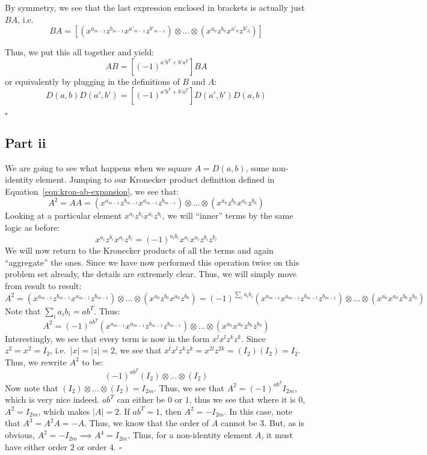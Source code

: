 \documentclass[letterpaper]{article}
\newcommand*{\QED}{\hfill\ensuremath{\square}}%
\begin{document}
By symmetry, we see that the last expression enclosed in brackets is actually just $ BA $, i.e.
\[
BA = \left[(x^{a_{m - 1}} z^{b_{m - 1}} x^{a'_{m - 1}} z^{b'_{m - 1}}) \otimes \ldots \otimes (x^{a_{0}} z^{b_{0}} x^{a'_{0}} z^{b'_{0}}) \right]
\]

Thus, we put this all together and yield:
\[
AB = \left[{(-1)}^{a'b^T + b'a^T}\right] BA
\]
or equivalently by plugging in the definitions of $ B $ and $ A $:
\[
D(a,b)D(a',b') = \left[{(-1)}^{a'b^T + b'a^T}\right] D(a',b')D(a,b)
\]

\QED{}

\subsection{Part ii}
\label{sub:5Partii}

We are going to see what happens when we square $ A = D(a,b) $, some non-identity element.
Jumping to our Kronecker product definition defined in Equation~\ref{eqn:kron-ab-expansion}, we see that:
\[
A^2 = AA = (x^{a_{m - 1}} z^{b_{m - 1}} x^{a_{m - 1}} z^{b_{m - 1}}) \otimes \ldots \otimes (x^{a_{0}} z^{b_{0}} x^{a_{0}} z^{b_{0}})
\]
Looking at a particular element $ x^{a_{i}} z^{b_{i}} x^{a_{i}} z^{b_{i}} $, we will ``inner'' terms by the same logic as before:
\[
x^{a_{i}} z^{b_{i}} x^{a_{i}} z^{b_{i}}
=
{(-1)}^{a_i b_i} x^{a_{i}} x^{a_{i}} z^{b_{i}} z^{b_{i}}
\]
We will now return to the Kronecker products of all the terms and again ``aggregate'' the ones.
Since we have now performed this operation twice on this problem set already, the details are extremely clear.
Thus, we will simply move from result to result:
\[
A^2
=
(x^{a_{m - 1}} z^{b_{m - 1}} x^{a_{m - 1}} z^{b_{m - 1}}) \otimes \ldots \otimes (x^{a_{0}} z^{b_{0}} x^{a_{0}} z^{b_{0}})
=
{(-1)}^{\sum_i a_i b_i}
(x^{a_{m - 1}} x^{a_{m - 1}} z^{b_{m - 1}} z^{b_{m - 1}}) \otimes \ldots \otimes (x^{a_{0}} x^{a_{0}} z^{b_{0}} z^{b_{0}})
\]
Note that $ \sum_i a_i b_i = ab^T $.
Thus:
\[
A^2 =
{(-1)}^{ab^T}
(x^{a_{m - 1}} x^{a_{m - 1}} z^{b_{m - 1}} z^{b_{m - 1}}) \otimes \ldots \otimes (x^{a_{0}} x^{a_{0}} z^{b_{0}} z^{b_{0}})
\]
Interestingly, we see that every term is now in the form $ x^l x^l z^k z^k $.
Since $ z^2 = x^2 = I_2 $, i.e.\ $ |x| = |z| = 2 $, we see that $ x^l x^l z^k z^k = x^{2l} z^{2k} = (I_2)(I_2) = I_2 $.
Thus, we rewrite $ A^2 $ to be:
\[
{(-1)}^{ab^T}
(I_2) \otimes \ldots \otimes (I_2)
\]
Now note that $ (I_2) \otimes \ldots \otimes (I_2) = I_{2m} $.
Thus, we see that $ A^2 = {(-1)}^{ab^T} I_{2m} $, which is very nice indeed.
$ ab^T $ can either be $ 0 $ or $ 1 $, thus we see that where it is $ 0 $, $ A^2 = I_{2m} $, which makes $ |A| = 2 $.
If $ ab^T = 1 $, then $ A^2 = -I_{2m} $.
In this case, note that $ A^3 = A^2 A = -A $.
Thus, we know that the order of $ A $ cannot be $ 3 $.
But, as is obvious, $ A^2 = -I_{2m} \implies A^4 = I_{2m} $.
Thus, for a non-identity element $ A $, it must have either order $ 2 $ or order $ 4 $.
\QED{}
\end{document}
